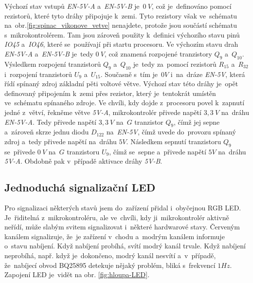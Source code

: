 Výchozí stav vstupů {\itshape EN-5V-A} a~{\itshape  EN-5V-B} je~\(0~V\), což je~definováno pomocí rezistorů, které tyto dráhy připojuje k~zemi.
Tyto rezistory však ve~schématu na~obr.\ref{fig:spinac_vikonove_vetve} nenajdete, protože jsou součástí schématu s~mikrokontrolérem.
Tam jsou zároveň použity k~definici výchozího stavu pinů {\it IO45} a~{\it IO46}, které se~používají při startu procesoru.
Ve výchozím stavu drah {\itshape EN-5V-A} a~{\itshape EN-5V-B} je~tedy \(0~V\), což znamená rozpojené tranzistory \(Q_9\) a~\(Q_{10}\).
Výsledkem rozpojení tranzistorů \(Q_9\) a~\(Q_{10}\) je~tedy za~pomocí rezistorů \(R_{15}\) a~\(R_{32}\) i~rozpojení tranzistorů \(U_{9}\) a~\(U_{15}\).
Současně s~tím je~\(0V\) i~na~dráze {\itshape EN-5V}, která řídí spínaný zdroj základní pěti voltové větve.
Výchozí stav této dráhy je~opět definovaný připojením k~zemi přes rezistor, který je~tentokrát umístěn ve~schématu spínaného zdroje.
Ve chvíli, kdy dojde z~procesoru povel k~zapnutí jedné z~větví, řekněme větve {\itshape 5V-A}, mikrokontrolér přivede napětí \(3,3~V\) na~dráhu {\itshape EN-5V-A}.
Tedy přivede napětí \(3,3~V\) na~\(G\) tranzistor \(Q_9\), čímž jej sepne a~zároveň skrze jednu diodu \(D_{122}\) na~{\itshape EN-5V}, čímž uvede do~provozu spínaný zdroj a~tedy přivede napětí na~dráhu \(5V\).
Následkem sepnutí tranzistoru \(Q_9\) se~přivede \(0~V\) na~\(G\) tranzistoru \(U_{9}\), čímž se~sepne a~přivede napětí \(5V\) na~dráhu {\itshape 5V-A}.
Obdobně pak v~případě aktivace dráhy {\itshape 5V-B}.


\subsection{Jednoduchá signalizační LED}

Pro signalizaci některých stavů jsem do~zařízení přidal i~obyčejnou RGB LED.
Je~řiditelná z~mikrokontroléru, ale ve~chvíli, kdy ji~mikrokontrolér aktivně neřídí, může slabým svitem signalizovat i~některé hardwarové stavy.
Červeným kanálem signalizuje, že~je zařízení v~chodu a~modrým kanálem informuje o~stavu nabíjení.
Když nabíjení probíhá, svítí modrý kanál trvale.
Když nabíjení neprobíhá, např. když je~dokončeno, modrý kanál nesvítí a~v~případě, že~nabíjecí obvod BQ25895 \cite{BQ25895} detekuje nějaký problém, bliká s~frekvencí \(1 Hz\).
Zapojení LED je~vidět na obr. \ref{fig:hloupa-LED}.

